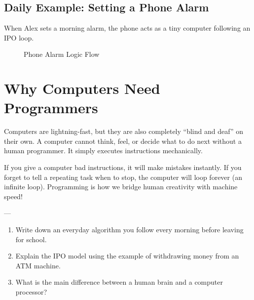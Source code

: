\subsection{Daily Example: Setting a Phone Alarm}

When Alex sets a morning alarm, the phone acts as a tiny computer following an IPO loop.

\begin{figure}[h]
    \centering
    \caption{Phone Alarm Logic Flow}
    \label{fig:alarm_flow}
\end{figure}

\section{Why Computers Need Programmers}

Computers are lightning-fast, but they are also completely ``blind and deaf'' on their own. A computer cannot think, feel, or decide what to do next without a human programmer. It simply executes instructions mechanically.

If you give a computer bad instructions, it will make mistakes instantly. If you forget to tell a repeating task when to stop, the computer will loop forever (an infinite loop). Programming is how we bridge human creativity with machine speed!

---

\begin{exercise}
\begin{enumerate}
    \item Write down an everyday algorithm you follow every morning before leaving for school.
    \item Explain the IPO model using the example of withdrawing money from an ATM machine.
    \item What is the main difference between a human brain and a computer processor?
\end{enumerate}
\end{exercise}